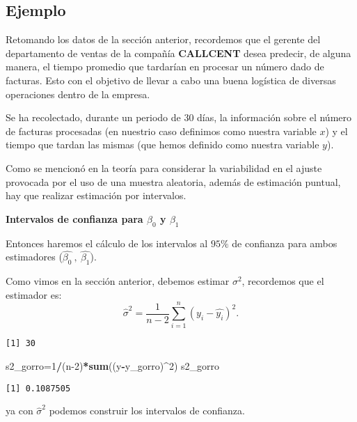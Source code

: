 \documentclass[
  a4paper,
  oneside,
  openany]{book}
\newenvironment{Shaded}{\begin{snugshade}}{\end{snugshade}}
\newcommand{\DecValTok}[1]{\textcolor[rgb]{0.00,0.00,0.81}{#1}}
\newcommand{\FunctionTok}[1]{\textcolor[rgb]{0.13,0.29,0.53}{\textbf{#1}}}
\newcommand{\NormalTok}[1]{#1}
\newcommand{\OtherTok}[1]{\textcolor[rgb]{0.56,0.35,0.01}{#1}}
\newcommand{\SpecialCharTok}[1]{\textcolor[rgb]{0.81,0.36,0.00}{\textbf{#1}}}
\begin{document}
\hypertarget{ejemplo-17}{%
\subsection{Ejemplo}\label{ejemplo-17}}

Retomando los datos de la sección anterior, recordemos que el gerente del departamento de ventas de la compañía \textbf{CALLCENT} desea predecir, de alguna manera, el tiempo promedio que tardarían en procesar un número dado de facturas. Esto con el objetivo de llevar a cabo una buena logística de diversas operaciones dentro de la empresa.

Se ha recolectado, durante un periodo de 30 días, la información sobre el número de facturas procesadas (en nuestrio caso definimos como nuestra variable \(x\)) y el tiempo que tardan las mismas (que hemos definido como nuestra variable \(y\)).

Como se mencionó en la teoría para considerar la variabilidad en el ajuste provocada por el uso de una muestra aleatoria, además de estimación puntual, hay que realizar estimación por intervalos.

\textbf{Intervalos de confianza para \(\beta_{0}\) y \(\beta_{1}\)}

Entonces haremos el cálculo de los intervalos al \(95\%\) de confianza para ambos estimadores (\(\hat{\beta_{0}} \ , \ \hat{\beta_{1}}\)).

Como vimos en la sección anterior, debemos estimar \(\sigma^2\), recordemos que el estimador es:
\[\hat{\sigma}^2=\frac{1}{n-2}\sum_{i=1}^{n}(y_{i}-\hat{y_{i}})^2.\]

\begin{verbatim}
[1] 30
\end{verbatim}

\begin{Shaded}
\begin{Highlighting}[]
\NormalTok{s2\_gorro}\OtherTok{=}\DecValTok{1}\SpecialCharTok{/}\NormalTok{(n}\DecValTok{{-}2}\NormalTok{)}\SpecialCharTok{*}\FunctionTok{sum}\NormalTok{((y}\SpecialCharTok{{-}}\NormalTok{y\_gorro)}\SpecialCharTok{\^{}}\DecValTok{2}\NormalTok{)}
\NormalTok{s2\_gorro}
\end{Highlighting}
\end{Shaded}

\begin{verbatim}
[1] 0.1087505
\end{verbatim}

ya con \(\hat{\sigma}^2\) podemos construir los intervalos de confianza.
\end{document}
